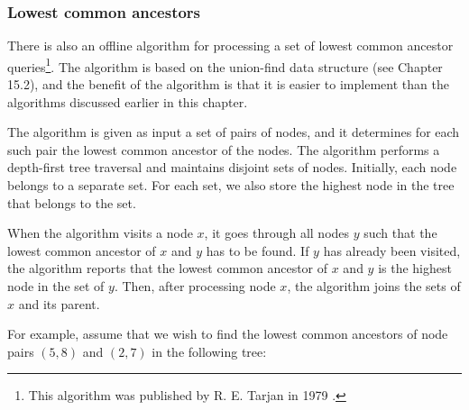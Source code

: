 \subsubsection{Lowest common ancestors}

There is also an offline algorithm
for processing a set of
lowest common ancestor queries\footnote{This
algorithm was published by R. E. Tarjan in 1979 \cite{tar79}.}.
The algorithm is based on the union-find data structure
(see Chapter 15.2), and the benefit of the algorithm is
that it is easier to implement than the
algorithms discussed earlier in this chapter.

The algorithm is given as input a set of pairs of nodes,
and it determines for each such pair the
lowest common ancestor of the nodes.
The algorithm performs a depth-first tree traversal
and maintains disjoint sets of nodes.
Initially, each node belongs to a separate set.
For each set, we also store the highest node in the
tree that belongs to the set.

When the algorithm visits a node $x$,
it goes through all nodes $y$ such that
the lowest common ancestor of $x$ and $y$
has to be found.
If $y$ has already been visited,
the algorithm reports that the 
lowest common ancestor of $x$ and $y$
is the highest node in the set of $y$.
Then, after processing node $x$,
the algorithm joins the sets of $x$ and its parent.

For example, assume that we wish to find the lowest
common ancestors of node pairs $(5,8)$
and $(2,7)$ in the following tree:
\begin{center}
\end{center}

